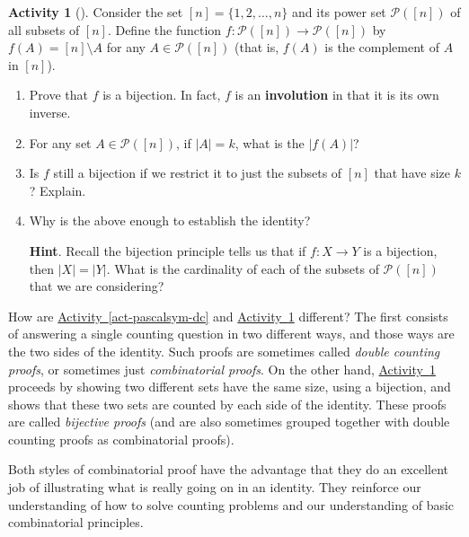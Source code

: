 \documentclass[10pt,]{book}
\newcommand{\terminology}[1]{\textbf{#1}}
\theoremstyle{plain}
\theoremstyle{definition}
\theoremstyle{definition}
\theoremstyle{definition}
\newtheorem{activity}[project]{Activity}
\numberwithin{equation}{chapter}
\def\pow{\mathcal P}
\newcommand{\card}[1]{\left| #1 \right|}
\begin{document}
\begin{activity}[]\label{act-pascalsym-bij}
\hypertarget{p-566}{}%
Consider the set \([n] = \{1,2,\ldots,n\}\) and its power set \(\pow([n])\) of all subsets of \([n]\).  Define the function \(f:\pow([n]) \to \pow([n])\) by \(f(A) = [n]\setminus A\) for any \(A \in \pow([n])\) (that is, \(f(A)\) is the complement of \(A\) in \([n]\)).%
\begin{enumerate}[font=\bfseries,label=(\alph*),ref=\alph*]
\item\label{task-105} \hypertarget{p-567}{}%
Prove that \(f\) is a bijection.  In fact, \(f\) is an \terminology{involution} in that it is its own inverse.%
\item\label{task-106} \hypertarget{p-568}{}%
For any set \(A \in \pow([n])\), if \(\card{A} = k\), what is the \(\card{f(A)}\)?%
\item\label{task-107} \hypertarget{p-569}{}%
Is \(f\) still a bijection if we restrict it to just the subsets of \([n]\) that have size \(k\)?  Explain.%
\item\label{task-108} \hypertarget{p-570}{}%
Why is the above enough to establish the identity?%
\par\smallskip%
\noindent\textbf{Hint}.\hypertarget{hint-31}{}\quad%
\hypertarget{p-571}{}%
Recall the bijection principle tells us that if \(f:X \to Y\) is a bijection, then \(\card{X} = \card{Y}\).  What is the cardinality of each of the subsets of \(\pow([n])\) that we are considering?%
\end{enumerate}
\end{activity}
\hypertarget{p-572}{}%
How are \hyperref[act-pascalsym-dc]{Activity~\ref{act-pascalsym-dc}} and \hyperref[act-pascalsym-bij]{Activity~\ref{act-pascalsym-bij}} different?  The first consists of answering a single counting question in two different ways, and those ways are the two sides of the identity.  Such proofs are sometimes called \emph{double counting proofs}, or sometimes just \emph{combinatorial proofs}.  On the other hand, \hyperref[act-pascalsym-bij]{Activity~\ref{act-pascalsym-bij}} proceeds by showing two different sets have the same size, using a bijection, and shows that these two sets are counted by each side of the identity.  These proofs are called \emph{bijective proofs} (and are also sometimes grouped together with double counting proofs as combinatorial proofs).%
\par
\hypertarget{p-573}{}%
Both styles of combinatorial proof have the advantage that they do an excellent job of illustrating what is really going on in an identity.  They reinforce our understanding of how to solve counting problems and our understanding of basic combinatorial principles.%
\end{document}
